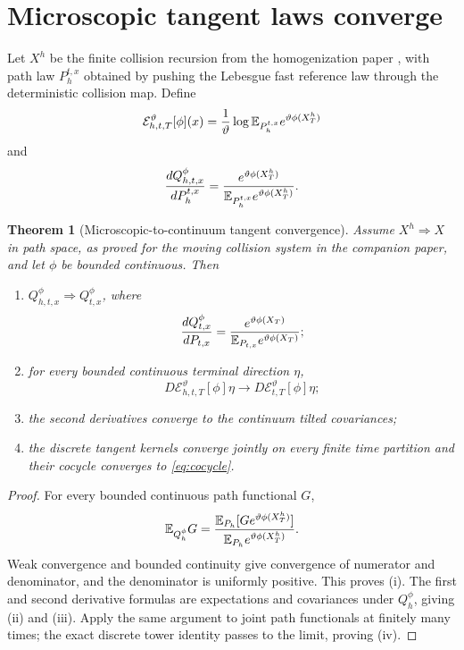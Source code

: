 \documentclass[11pt,reqno]{amsart}
\newtheorem{theorem}{Theorem}[section]
\theoremstyle{definition}
\theoremstyle{remark}
\newcommand{\E}{\mathbb E}
\newcommand{\cE}{\mathcal E}
\begin{document}
\section{Microscopic tangent laws converge}

Let $X^h$ be the finite collision recursion from the homogenization paper
\cite{QiRoughRound4}, with path law $P_h^{t,x}$ obtained by pushing the
Lebesgue fast reference law through the deterministic collision map.  Define
\begin{equation}\label{eq:discrete-theta}
 \cE_{h,t,T}^{\vartheta}[\phi](x)
 ={1\over\vartheta}\log
 \E_{P_h^{t,x}}e^{\vartheta\phi(X_T^h)}
\end{equation}
and
\begin{equation}\label{eq:discrete-tangent}
 {dQ_{h,t,x}^{\phi}\over dP_h^{t,x}}
 ={e^{\vartheta\phi(X_T^h)}
  \over\E_{P_h^{t,x}}e^{\vartheta\phi(X_T^h)}}.
\end{equation}

\begin{theorem}[Microscopic-to-continuum tangent convergence]\label{thm:micro-tangent}
Assume $X^h\Rightarrow X$ in path space, as proved for the moving collision
system in the companion paper, and let $\phi$ be bounded continuous.  Then
\begin{enumerate}[label=(\roman*)]
\item $Q_{h,t,x}^{\phi}\Rightarrow Q_{t,x}^{\phi}$, where
\[
 {dQ_{t,x}^{\phi}\over dP_{t,x}}
 ={e^{\vartheta\phi(X_T)}
  \over\E_{P_{t,x}}e^{\vartheta\phi(X_T)}};
\]
\item for every bounded continuous terminal direction $\eta$,
\[
 D\cE_{h,t,T}^{\vartheta}[\phi]\eta
 \longrightarrow D\cE_{t,T}^{\vartheta}[\phi]\eta;
\]
\item the second derivatives converge to the continuum tilted covariances;
\item the discrete tangent kernels converge jointly on every finite time
partition and their cocycle converges to \eqref{eq:cocycle}.
\end{enumerate}
\end{theorem}

\begin{proof}
For every bounded continuous path functional $G$,
\[
 \E_{Q_h^\phi}G
 ={\E_{P_h}[G e^{\vartheta\phi(X_T^h)}]
  \over\E_{P_h}e^{\vartheta\phi(X_T^h)}}.
\]
Weak convergence and bounded continuity give convergence of numerator and
denominator, and the denominator is uniformly positive.  This proves (i).
The first and second derivative formulas are expectations and covariances under
$Q_h^\phi$, giving (ii) and (iii).  Apply the same argument to joint path
functionals at finitely many times; the exact discrete tower identity passes to
the limit, proving (iv).
\end{proof}
\end{document}
